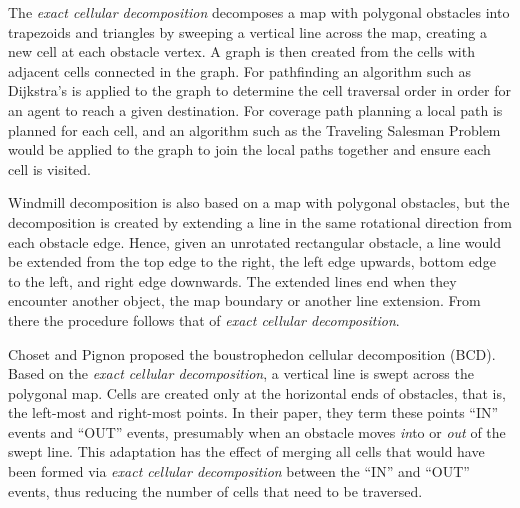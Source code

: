 The \textit{exact cellular decomposition} decomposes a map with polygonal obstacles into trapezoids and triangles by sweeping a vertical line across the map, creating a new cell at each obstacle vertex\cite{Robot_motion_planning}.
A graph is then created from the cells with adjacent cells connected in the graph.
For pathfinding an algorithm such as Dijkstra's is applied to the graph to determine the cell traversal order in order for an agent to reach a given destination.
For coverage path planning a local path is planned for each cell, and an algorithm such as the Traveling Salesman Problem would be applied to the graph to join the local paths together and ensure each cell is visited.

Windmill decomposition is also based on a map with polygonal obstacles, but the decomposition is created by extending a line in the same rotational direction from each obstacle edge\cite{Windmill_decomp_for_free_pp}.
Hence, given an unrotated rectangular obstacle, a line would be extended from the top edge to the right, the left edge upwards, bottom edge to the left, and right edge downwards.
The extended lines end when they encounter another object, the map boundary or another line extension.
From there the procedure follows that of \textit{exact cellular decomposition}.

Choset and Pignon proposed the boustrophedon cellular decomposition (BCD)\cite{Bous_cellular_decomp}.
Based on the \textit{exact cellular decomposition}, a vertical line is swept across the polygonal map.
Cells are created only at the horizontal ends of obstacles, that is, the left-most and right-most points.
In their paper, they term these points ``IN'' events and ``OUT'' events, presumably when an obstacle moves \textit{in}to or \textit{out} of the swept line.
This adaptation has the effect of merging all cells that would have been formed via \textit{exact cellular decomposition} between the ``IN'' and ``OUT'' events, thus reducing the number of cells that need to be traversed.

